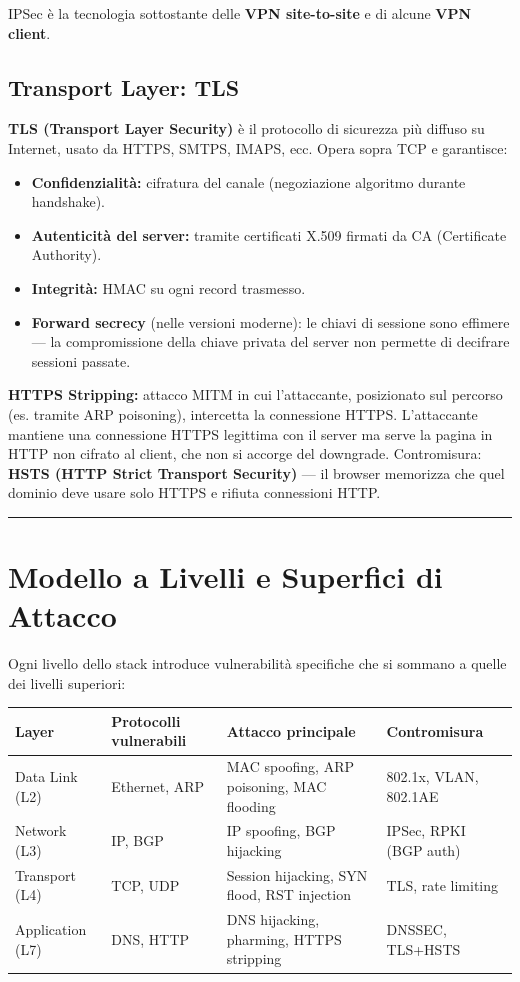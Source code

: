 \documentclass[12pt, a4paper]{report}
\begin{document}
IPSec è la tecnologia sottostante delle \textbf{VPN site-to-site} e di alcune \textbf{VPN client}.

\subsection{Transport Layer: TLS}
\textbf{TLS (Transport Layer Security)} è il protocollo di sicurezza più diffuso su Internet, usato da HTTPS, SMTPS, IMAPS, ecc. Opera sopra TCP e garantisce:
\begin{itemize}
	\item \textbf{Confidenzialità:} cifratura del canale (negoziazione algoritmo durante handshake).
	\item \textbf{Autenticità del server:} tramite certificati X.509 firmati da CA (Certificate Authority).
	\item \textbf{Integrità:} HMAC su ogni record trasmesso.
	\item \textbf{Forward secrecy} (nelle versioni moderne): le chiavi di sessione sono effimere — la compromissione della chiave privata del server non permette di decifrare sessioni passate.
\end{itemize}

\textbf{HTTPS Stripping:} attacco MITM in cui l'attaccante, posizionato sul percorso (es. tramite ARP poisoning), intercetta la connessione HTTPS. L'attaccante mantiene una connessione HTTPS legittima con il server ma serve la pagina in HTTP non cifrato al client, che non si accorge del downgrade. Contromisura: \textbf{HSTS (HTTP Strict Transport Security)} — il browser memorizza che quel dominio deve usare solo HTTPS e rifiuta connessioni HTTP.

\noindent\rule{\textwidth}{0.4pt}

\section{Modello a Livelli e Superfici di Attacco}

Ogni livello dello stack introduce vulnerabilità specifiche che si sommano a quelle dei livelli superiori:

\begin{table}[H]
	\centering
	\begin{tabular}{|l|l|p{4cm}|p{3.5cm}|}
		\hline
		\textbf{Layer} & \textbf{Protocolli vulnerabili} & \textbf{Attacco principale} & \textbf{Contromisura} \\ \hline
		Data Link (L2) & Ethernet, ARP & MAC spoofing, ARP poisoning, MAC flooding & 802.1x, VLAN, 802.1AE \\ \hline
		Network (L3) & IP, BGP & IP spoofing, BGP hijacking & IPSec, RPKI (BGP auth) \\ \hline
		Transport (L4) & TCP, UDP & Session hijacking, SYN flood, RST injection & TLS, rate limiting \\ \hline
		Application (L7) & DNS, HTTP & DNS hijacking, pharming, HTTPS stripping & DNSSEC, TLS+HSTS \\ \hline
	\end{tabular}
\end{table}
\end{document}

